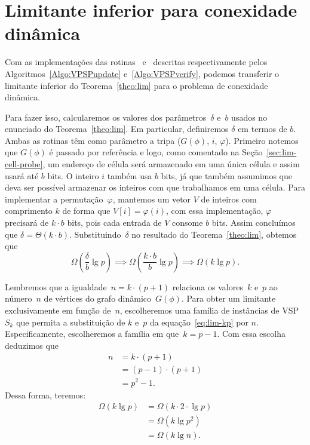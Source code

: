 \section{Limitante inferior para conexidade dinâmica}

Com as implementações das rotinas~\VPSPupdate{} e~\VPSPverify{} descritas respectivamente pelos Algoritmos~\ref{Algo:VPSPupdate} e~\ref{Algo:VPSPverify}, podemos transferir o limitante inferior do Teorema~\ref{theo:lim} para o problema de conexidade dinâmica. 

Para fazer isso, calcularemos os valores dos parâmetros~$\delta$ e~$b$ usados no enunciado do Teorema~\ref{theo:lim}. Em particular, definiremos  $\delta$ em termos de $b$. Ambas as rotinas têm como parâmetro a tripa ($G(\phi)$, $i$, $\varphi$). Primeiro notemos que $G(\phi)$ é passado por referência e logo, como comentado na Seção~\ref{sec:lim-cell-probe}, um endereço de célula será armazenado em uma única célula e assim usará até $b$ bits. O inteiro $i$ também usa $b$ bits, já que também assumimos que deva ser possível armazenar os inteiros com que trabalhamos em uma célula. Para implementar a permutação~$\varphi$, mantemos um vetor $V$ de inteiros com comprimento $k$ de forma que $V[i] = \varphi(i)$, com essa implementação, $\varphi$ precisará de $k\cdot b$
bits, pois cada entrada de $V$ consome $b$ bits. Assim concluímos que $\delta = \Theta(k\cdot b)$.  Substituindo~$\delta$ no resultado do Teorema~\ref{theo:lim}, obtemos que
\begin{equation}
\Omega\left( \frac{\delta}{b}\lg p \right)\implies \Omega\left(\frac{k\cdot b}{b}\lg p\right)\implies \Omega(k\lg p).\label{eq:lim-kp}
\end{equation}

Lembremos que a igualdade~$n=k\cdot (p+1)$ relaciona os valores~$k$ e~$p$ ao número~$n$ de vértices do grafo dinâmico~$G(\phi)$. Para obter um limitante exclusivamente em função de~$n$, escolheremos uma família de instâncias de VSP$S_k$ que permita a substituição de $k$ e~$p$ da equação~\ref{eq:lim-kp} por $n$. Especificamente, escolheremos a família em que~$k = p-1$. Com essa escolha deduzimos que
\begin{align*}
n&=k\cdot (p+1)\\
&=(p-1)\cdot  (p+1)\\
&=p^2-1.
\end{align*}
Dessa forma, teremos:
\begin{align}
    \Omega(k \lg p) &= \Omega(k\cdot  2\cdot \lg p) \nonumber\\
        &= \Omega(k \lg p^2) \nonumber\\
        &= \Omega(k \lg n).\nonumber
\end{align}

